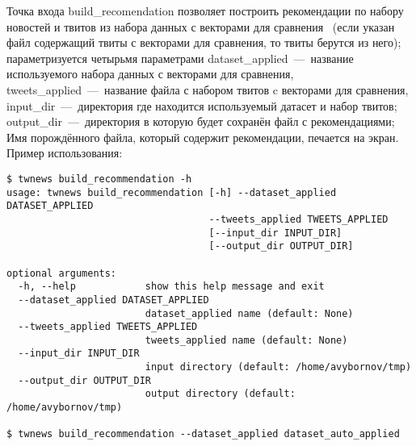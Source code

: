         Точка входа build\_recomendation позволяет построить рекомендации по набору новостей и твитов из набора данных с векторами для сравнения
        ~(если указан файл содержащий твиты с векторами для сравнения, то твиты берутся из него);
        параметризуется четырьмя параметрами
        dataset\_applied~---~название используемого набора данных с векторами для сравнения,
        tweets\_applied~---~название файла с набором твитов c векторами для сравнения,
        input\_dir~---~директория где находится используемый датасет и набор твитов;
        output\_dir~---~директория в которую будет сохранён файл с рекомендациями;
        Имя порождённого файла, который содержит рекомендации, печается на экран. Пример использования:
        \begin{lstlisting}
$ twnews build_recommendation -h
usage: twnews build_recommendation [-h] --dataset_applied DATASET_APPLIED
                                   --tweets_applied TWEETS_APPLIED
                                   [--input_dir INPUT_DIR]
                                   [--output_dir OUTPUT_DIR]

optional arguments:
  -h, --help            show this help message and exit
  --dataset_applied DATASET_APPLIED
                        dataset_applied name (default: None)
  --tweets_applied TWEETS_APPLIED
                        tweets_applied name (default: None)
  --input_dir INPUT_DIR
                        input directory (default: /home/avybornov/tmp)
  --output_dir OUTPUT_DIR
                        output directory (default: /home/avybornov/tmp)

$ twnews build_recommendation --dataset_applied dataset_auto_applied
        \end{lstlisting}


